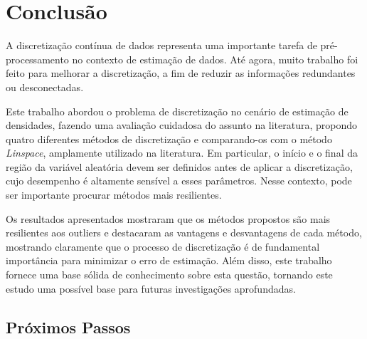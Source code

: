 \chapter{Conclusão} \label{cap:conclusao}
\vspace{-2cm}
A discretização contínua de dados representa uma importante tarefa de pré-processamento no contexto de estimação de dados. Até agora, muito trabalho foi feito para melhorar a discretização, a fim de reduzir as informações redundantes ou desconectadas.

Este trabalho abordou o problema de discretização no cenário de estimação de densidades, fazendo uma avaliação cuidadosa do assunto na literatura, propondo quatro diferentes métodos de discretização e comparando-os com o método \textit{Linspace}, amplamente utilizado na literatura. Em particular, o início e o final da região da variável aleatória devem ser definidos antes de aplicar a discretização, cujo desempenho é altamente sensível a esses parâmetros. Nesse contexto, pode ser importante procurar métodos mais resilientes.

Os resultados apresentados mostraram que os métodos propostos são mais resilientes aos outliers e destacaram as vantagens e desvantagens de cada método, mostrando claramente que o processo de discretização é de fundamental importância para minimizar o erro de estimação. Além disso, este trabalho fornece uma base sólida de conhecimento sobre esta questão, tornando este estudo uma possível base para futuras investigações aprofundadas.
\section{Próximos Passos}